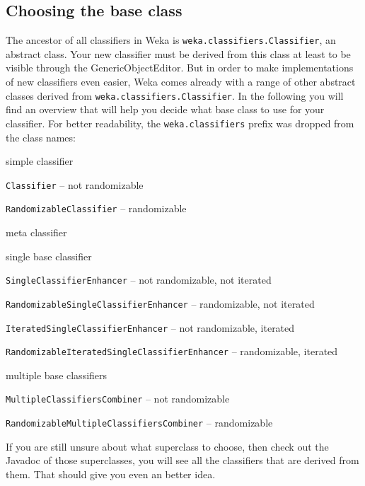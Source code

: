 \subsection{Choosing the base class}
The ancestor of all classifiers in Weka is \texttt{weka.classifiers.Classifier},
an abstract class. Your new classifier must be derived from this class at
least to be visible through the GenericObjectEditor. But in order to
make implementations of new classifiers even easier, Weka comes already with a
range of other abstract classes derived from
\texttt{weka.classifiers.Classifier}. In the following you will find an overview
that will help you decide what base class to use for your classifier. For better
readability, the \texttt{weka.classifiers} prefix was dropped from the class
names:
\begin{tight_itemize}
  \item simple classifier
	\begin{tight_itemize}
	  \item \texttt{Classifier} -- not randomizable
	  \item \texttt{RandomizableClassifier} -- randomizable
	\end{tight_itemize}
  \item meta classifier
	\begin{tight_itemize}
	  \item single base classifier
		\begin{tight_itemize}
		  \item \texttt{SingleClassifierEnhancer} -- not randomizable, not
iterated
		  \item \texttt{RandomizableSingleClassifierEnhancer} -- randomizable,
not iterated
		  \item \texttt{IteratedSingleClassifierEnhancer} -- not randomizable,
iterated
		  \item \texttt{RandomizableIteratedSingleClassifierEnhancer} --
randomizable, iterated
		\end{tight_itemize}
	  \item multiple base classifiers
		\begin{tight_itemize}
		  \item \texttt{MultipleClassifiersCombiner} -- not randomizable
		  \item \texttt{RandomizableMultipleClassifiersCombiner} -- randomizable
		\end{tight_itemize}
	\end{tight_itemize}
\end{tight_itemize}
If you are still unsure about what superclass to choose, then check out the
Javadoc of those superclasses, you will see all the classifiers that are derived
from them. That should give you even an better idea.

